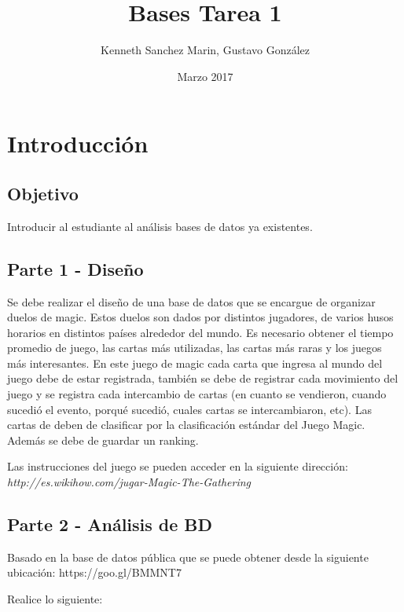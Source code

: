 \documentclass{article}
\title{Bases Tarea 1}
\author{Kenneth Sanchez Marin, Gustavo González }
\date{Marzo 2017}
\begin{document}
\maketitle

\section{Introducción}
\subsection{Objetivo}
Introducir al estudiante al análisis bases de datos ya existentes.
\subsection{Parte 1 - Diseño}
Se debe realizar el diseño de una base de datos que se encargue de organizar duelos de magic. Estos duelos son dados por distintos jugadores, de varios husos horarios en distintos países alrededor del mundo. Es necesario obtener el tiempo promedio de juego, las cartas más utilizadas, las cartas más raras y los juegos más interesantes. En este juego de magic cada carta que ingresa al mundo del juego debe de estar registrada, también se debe de registrar cada movimiento del juego y se registra cada intercambio de cartas (en cuanto se vendieron, cuando sucedió el evento, porqué sucedió, cuales cartas se intercambiaron, etc). Las cartas de deben de clasificar por la clasificación estándar del Juego Magic. Además se debe de guardar un ranking.

Las instrucciones del juego se pueden acceder en la siguiente dirección:
\textit{http://es.wikihow.com/jugar-Magic-The-Gathering}
\subsection{Parte 2 - Análisis de BD}
Basado en la base de datos pública que se puede obtener desde la siguiente ubicación: 
https://goo.gl/BMMNT7

Realice lo siguiente:
\end{document}
